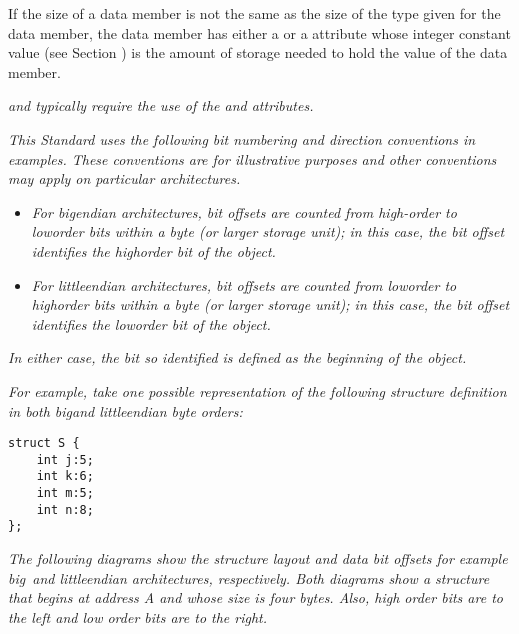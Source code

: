 If the size of a data member is not the same as the size
of the type given for the data member, the data member has
either a  
or a  attribute whose
integer constant value 
(see Section ) 
is the amount
of storage needed to hold the value of the data member.

\textit{ and  
typically 
require the use 
of 
the
 and 
 attributes.}

\textit{This Standard uses the following bit numbering and direction
conventions in examples. These conventions are for illustrative
purposes and other conventions may apply on particular
architectures.}


\begin{itemize}
\item \textit{For big\dash endian architectures, bit offsets are
counted from high-order to low\dash order bits within a byte (or
larger storage unit); in this case, the bit offset identifies
the high\dash order bit of the object.}

\item \textit{For little\dash endian architectures, bit offsets are
counted from low\dash order to high\dash order bits within a byte (or
larger storage unit); in this case, the bit offset identifies
the low\dash order bit of the object.}
\end{itemize}


\textit{In either case, the bit so identified is defined as the 
beginning of the object.}

\textit{For example, take one possible representation of the following 
 structure definition 
in both big\dash and little\dash endian byte orders:}

\begin{lstlisting}
struct S {
    int j:5;
    int k:6;
    int m:5;
    int n:8;
};
\end{lstlisting}

\textit{The following diagrams show the structure layout
and data bit offsets for example big\dash\   and little\dash endian
architectures, respectively. Both diagrams show a structure
that begins at address A and whose size is four bytes. Also,
high order bits are to the left and low order bits are to
the right.}

